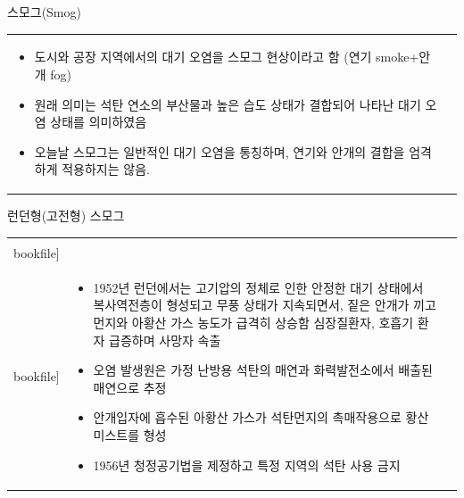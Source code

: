 \begin{frame}[t]{스모그(Smog)}
	\begin{tabular}{ll}
		\begin{minipage}[t]{0.6\textwidth}\scriptsize
			\begin{itemize}
				\item 도시와 공장 지역에서의 대기 오염을 스모그 현상이라고 함 (연기 smoke+안개 fog)
				\item 원래 의미는 석탄 연소의 부산물과 높은 습도 상태가 결합되어 나타난 대기 오염 상태를  의미하였음
				\item 오늘날 스모그는 일반적인 대기 오염을 통칭하며, 연기와 안개의 결합을 엄격하게 적용하지는 않음.
			\end{itemize}
		\end{minipage}	
		&
		\begin{minipage}[t]{0.35\textwidth} \scriptsize	
			

		\end{minipage}
	\end{tabular}
\end{frame}



\begin{frame}[t]{런던형(고전형) 스모그}
	\begin{tabular}{lll}
		\begin{minipage}[t]{0.25\textwidth}\scriptsize
			\begin{figure}[t]
				\texttt{[image: \\bookfile]}
			\end{figure}
		\end{minipage}	
		&
		\begin{minipage}[t]{0.25\textwidth}\scriptsize
			\begin{figure}[t]
				\texttt{[image: \\bookfile]}
			\end{figure}
		\end{minipage}	
		&
		\begin{minipage}[t]{0.45\textwidth} \scriptsize	
			\begin{itemize}
				\item 1952년 런던에서는 고기압의 정체로 인한 안정한 대기 상태에서 복사역전층이 형성되고 무풍 상태가 지속되면서, 짙은 안개가 끼고 먼지와 아황산 가스 농도가 급격히 상승함
				심장질환자, 호흡기 환자 급증하며 사망자 속출
				\item 오염 발생원은 가정 난방용 석탄의 매연과 화력발전소에서 배출된 매연으로 추정
				\item 안개입자에 흡수된 아황산 가스가 석탄먼지의 촉매작용으로 황산미스트를 형성
				\item 1956년 청정공기법을 제정하고 특정 지역의 석탄 사용 금지
					
			\end{itemize}

		\end{minipage}
	\end{tabular}
\end{frame}






